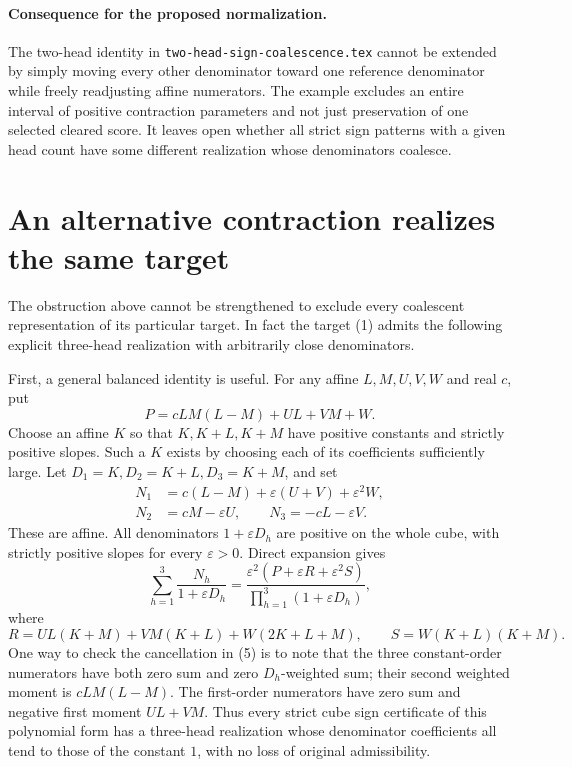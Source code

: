 \documentclass[11pt]{article}
\begin{document}
\paragraph{Consequence for the proposed normalization.}
The two-head identity in \texttt{two-head-sign-coalescence.tex} cannot
be extended by simply moving every other denominator toward one
reference denominator while freely readjusting affine numerators.
The example excludes an entire interval of positive contraction
parameters and not just preservation of one selected cleared score.
It leaves open whether all strict sign patterns with a given head
count have some different realization whose denominators coalesce.

\section*{An alternative contraction realizes the same target}
The obstruction above cannot be strengthened to exclude every
coalescent representation of its particular target. In fact the
target (1) admits the following explicit three-head realization with
arbitrarily close denominators.

First, a general balanced identity is useful. For any affine
$L,M,U,V,W$ and real $c$, put
\[
 P=cLM(L-M)+UL+VM+W.
\]
Choose an affine $K$ so that $K,K+L,K+M$ have positive constants and
strictly positive slopes. Such a $K$ exists by choosing each of its
coefficients sufficiently large. Let $D_1=K,D_2=K+L,D_3=K+M$, and set
\[
 \begin{aligned}
 N_1&=c(L-M)+\varepsilon(U+V)+\varepsilon^2W,\\
 N_2&=cM-\varepsilon U,\qquad
 N_3=-cL-\varepsilon V.
 \end{aligned}
\]
These are affine. All denominators $1+\varepsilon D_h$ are positive
on the whole cube, with strictly positive slopes for every
$\varepsilon>0$. Direct expansion gives
\[
 \sum_{h=1}^3\frac{N_h}{1+\varepsilon D_h}
 =\frac{\varepsilon^2(P+\varepsilon R+\varepsilon^2S)}
 {\prod_{h=1}^3(1+\varepsilon D_h)},                    \tag{5}
\]
where
\[
 R=UL(K+M)+VM(K+L)+W(2K+L+M),\qquad
 S=W(K+L)(K+M).
\]
One way to check the cancellation in (5) is to note that the three
constant-order numerators have both zero sum and zero $D_h$-weighted
sum; their second weighted moment is $cLM(L-M)$. The first-order
numerators have zero sum and negative first moment $UL+VM$.
Thus every strict cube sign certificate of this polynomial form has
a three-head realization whose denominator coefficients all tend to
those of the constant $1$, with no loss of original admissibility.
\end{document}
